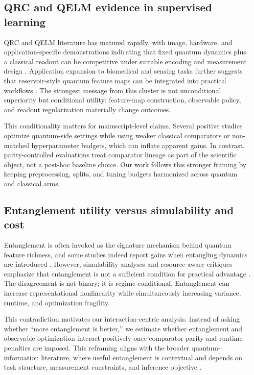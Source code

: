 \subsection{QRC and QELM evidence in supervised learning}
QRC and QELM literature has matured rapidly, with image, hardware, and application-specific demonstrations indicating that fixed quantum dynamics plus a classical readout can be competitive under suitable encoding and measurement design \citep{S001,S003,S004,S010,S023,S029,S032,S033,S036,S039}. Application expansion to biomedical and sensing tasks further suggests that reservoir-style quantum feature maps can be integrated into practical workflows \citep{S009,S014,S015,S017,S021,S031}. The strongest message from this cluster is not unconditional superiority but conditional utility: feature-map construction, observable policy, and readout regularization materially change outcomes.

This conditionality matters for manuscript-level claims. Several positive studies optimize quantum-side settings while using weaker classical comparators or non-matched hyperparameter budgets, which can inflate apparent gains. In contrast, parity-controlled evaluations treat comparator lineage as part of the scientific object, not a post-hoc baseline choice. Our work follows this stronger framing by keeping preprocessing, splits, and tuning budgets harmonized across quantum and classical arms.

\subsection{Entanglement utility versus simulability and cost}
Entanglement is often invoked as the signature mechanism behind quantum feature richness, and some studies indeed report gains when entangling dynamics are introduced \citep{S003,S033,S039}. However, simulability analyses and resource-aware critiques emphasize that entanglement is not a sufficient condition for practical advantage \citep{S002,S025,S026,S028,S034,S038}. The disagreement is not binary; it is regime-conditional. Entanglement can increase representational nonlinearity while simultaneously increasing variance, runtime, and optimization fragility.

This contradiction motivates our interaction-centric analysis. Instead of asking whether ``more entanglement is better,'' we estimate whether entanglement and observable optimization interact positively once comparator parity and runtime penalties are imposed. This reframing aligns with the broader quantum-information literature, where useful entanglement is contextual and depends on task structure, measurement constraints, and inference objective \citep{S012,S018,S019}.

